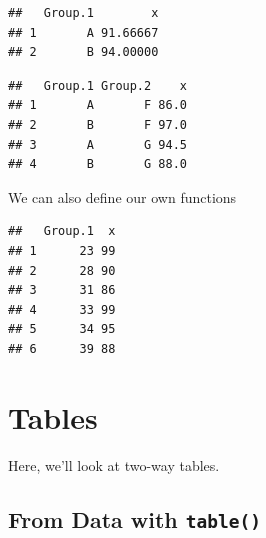 \documentclass[
]{book}
\newenvironment{Shaded}{\begin{snugshade}}{\end{snugshade}}
\newcommand{\AttributeTok}[1]{\textcolor[rgb]{0.77,0.63,0.00}{#1}}
\newcommand{\ControlFlowTok}[1]{\textcolor[rgb]{0.13,0.29,0.53}{\textbf{#1}}}
\newcommand{\FunctionTok}[1]{\textcolor[rgb]{0.00,0.00,0.00}{#1}}
\newcommand{\NormalTok}[1]{#1}
\newcommand{\OtherTok}[1]{\textcolor[rgb]{0.56,0.35,0.01}{#1}}
\newcommand{\SpecialCharTok}[1]{\textcolor[rgb]{0.00,0.00,0.00}{#1}}
\begin{document}
\begin{verbatim}
##   Group.1        x
## 1       A 91.66667
## 2       B 94.00000
\end{verbatim}

\begin{Shaded}
\end{Shaded}

\begin{verbatim}
##   Group.1 Group.2    x
## 1       A       F 86.0
## 2       B       F 97.0
## 3       A       G 94.5
## 4       B       G 88.0
\end{verbatim}

We can also define our own functions

\begin{Shaded}
\end{Shaded}

\begin{verbatim}
##   Group.1  x
## 1      23 99
## 2      28 90
## 3      31 86
## 4      33 99
## 5      34 95
## 6      39 88
\end{verbatim}

\hypertarget{tables}{%
\section{Tables}\label{tables}}

Here, we'll look at two-way tables.

\hypertarget{from-data-with-table}{%
\subsection{\texorpdfstring{From Data with \texttt{table()}}{From Data with table()}}\label{from-data-with-table}}
\end{document}
